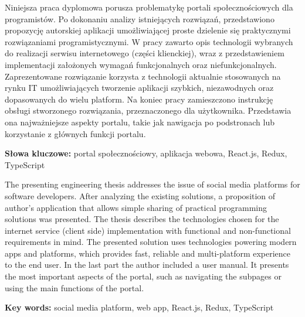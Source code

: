 \documentclass[a4paper,12pt,polish,twoside]{extreport}
\newenvironment{abstractpage}
  {\cleardoublepage\vspace*{\fill}\thispagestyle{empty}}
  {\vfill\cleardoublepage}
\newenvironment{multiabstract}[1]
  {\bigskip\selectlanguage{#1}%
   \begin{center}\bfseries\abstractname\end{center}}
  {\par\bigskip}
\begin{document}

% 
\begin{abstractpage}
    \begin{multiabstract}{polish}
        Niniejsza praca dyplomowa porusza problematykę portali społecznościowych dla programistów. Po dokonaniu analizy istniejących rozwiązań, przedstawiono propozycję autorskiej aplikacji umożliwiającej proste dzielenie się praktycznymi rozwiązaniami programistycznymi. W pracy zawarto opis technologii wybranych do realizacji serwisu internetowego (części klienckiej), wraz z przedstawieniem implementacji założonych wymagań funkcjonalnych oraz niefunkcjonalnych. Zaprezentowane rozwiązanie korzysta z technologii aktualnie stosowanych na rynku IT umożliwiających tworzenie aplikacji szybkich, niezawodnych oraz dopasowanych do wielu platform. Na koniec pracy zamieszczono instrukcję obsługi stworzonego rozwiązania, przeznaczonego dla użytkownika. Przedstawia ona najważniejsze aspekty portalu, takie jak nawigacja po podstronach lub korzystanie z głównych funkcji portalu.
        \newline

        \noindent\textbf{Słowa kluczowe:} portal społecznościowy, aplikacja webowa, React.js, Redux, TypeScript
    \end{multiabstract}

    \begin{multiabstract}{english}
        The presenting engineering thesis addresses the issue of social media platforms for software developers. After analyzing the existing solutions, a proposition of author's application that allows simple sharing of practical programming solutions was presented. The thesis describes the technologies chosen for the internet service (client side) implementation with functional and non-functional requirements in mind. The presented solution uses technologies powering modern apps and platforms, which provides fast, reliable and multi-platform experience to the end user. In the last part the author included a user manual. It presents the most important aspects of the portal, such as navigating the subpages or using the main functions of the portal.
        \newline

        \noindent\textbf{Key words:} social media platform, web app, React.js, Redux, TypeScript
    \end{multiabstract}
\end{abstractpage}
\end{document}
